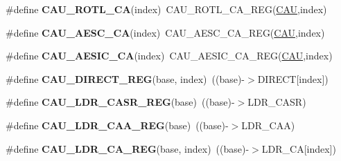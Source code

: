 \begin{DoxyCompactItemize}
\item 
\#define {\bfseries C\+A\+U\+\_\+\+R\+O\+T\+L\+\_\+\+CA}(index)~C\+A\+U\+\_\+\+R\+O\+T\+L\+\_\+\+C\+A\+\_\+\+R\+EG(\hyperlink{group__CAU__Peripheral__Access__Layer_ga0e3e4bb9b7bb5ef30b07e8925c56b950}{C\+AU},index)\hypertarget{group__CAU__Register__Accessor__Macros_ga7937a6362fddd808f677101e46c8a95a}{}\label{group__CAU__Register__Accessor__Macros_ga7937a6362fddd808f677101e46c8a95a}

\item 
\#define {\bfseries C\+A\+U\+\_\+\+A\+E\+S\+C\+\_\+\+CA}(index)~C\+A\+U\+\_\+\+A\+E\+S\+C\+\_\+\+C\+A\+\_\+\+R\+EG(\hyperlink{group__CAU__Peripheral__Access__Layer_ga0e3e4bb9b7bb5ef30b07e8925c56b950}{C\+AU},index)\hypertarget{group__CAU__Register__Accessor__Macros_ga3ffef6d404b59f0f9d6ae36f5fdc5da0}{}\label{group__CAU__Register__Accessor__Macros_ga3ffef6d404b59f0f9d6ae36f5fdc5da0}

\item 
\#define {\bfseries C\+A\+U\+\_\+\+A\+E\+S\+I\+C\+\_\+\+CA}(index)~C\+A\+U\+\_\+\+A\+E\+S\+I\+C\+\_\+\+C\+A\+\_\+\+R\+EG(\hyperlink{group__CAU__Peripheral__Access__Layer_ga0e3e4bb9b7bb5ef30b07e8925c56b950}{C\+AU},index)\hypertarget{group__CAU__Register__Accessor__Macros_gabc2e4ec881a8e397076e7db53aefe02f}{}\label{group__CAU__Register__Accessor__Macros_gabc2e4ec881a8e397076e7db53aefe02f}

\item 
\#define {\bfseries C\+A\+U\+\_\+\+D\+I\+R\+E\+C\+T\+\_\+\+R\+EG}(base,  index)~((base)-\/$>$D\+I\+R\+E\+CT\mbox{[}index\mbox{]})\hypertarget{group__CAU__Register__Accessor__Macros_ga7f4eee7e54be5139132863d07547e91e}{}\label{group__CAU__Register__Accessor__Macros_ga7f4eee7e54be5139132863d07547e91e}

\item 
\#define {\bfseries C\+A\+U\+\_\+\+L\+D\+R\+\_\+\+C\+A\+S\+R\+\_\+\+R\+EG}(base)~((base)-\/$>$L\+D\+R\+\_\+\+C\+A\+SR)\hypertarget{group__CAU__Register__Accessor__Macros_gabec32211c73be8204bceca3f0e7f0ad1}{}\label{group__CAU__Register__Accessor__Macros_gabec32211c73be8204bceca3f0e7f0ad1}

\item 
\#define {\bfseries C\+A\+U\+\_\+\+L\+D\+R\+\_\+\+C\+A\+A\+\_\+\+R\+EG}(base)~((base)-\/$>$L\+D\+R\+\_\+\+C\+AA)\hypertarget{group__CAU__Register__Accessor__Macros_gafb3070ebf83b68deba5d119812b501ea}{}\label{group__CAU__Register__Accessor__Macros_gafb3070ebf83b68deba5d119812b501ea}

\item 
\#define {\bfseries C\+A\+U\+\_\+\+L\+D\+R\+\_\+\+C\+A\+\_\+\+R\+EG}(base,  index)~((base)-\/$>$L\+D\+R\+\_\+\+CA\mbox{[}index\mbox{]})\hypertarget{group__CAU__Register__Accessor__Macros_ga23cfae3a6a7b964e68b5174b377bd276}{}\label{group__CAU__Register__Accessor__Macros_ga23cfae3a6a7b964e68b5174b377bd276}


\end{DoxyCompactItemize}
